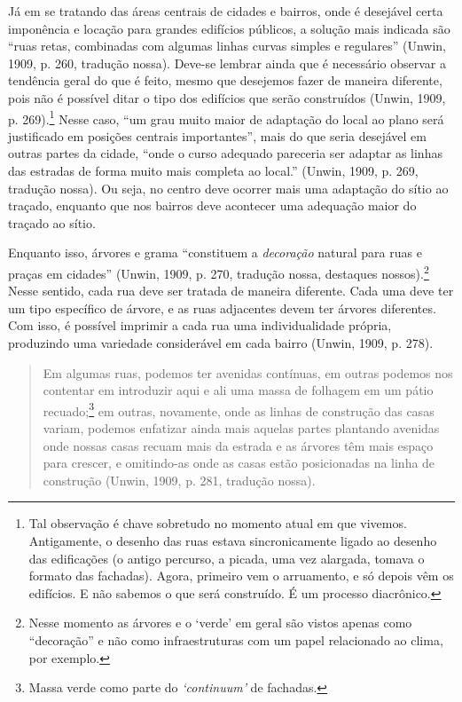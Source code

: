 \documentclass[12pt, a4paper]{book} %
\begin{document}
        Já em se tratando das áreas centrais de cidades e bairros, onde é desejável certa imponência e locação para grandes edifícios públicos, a solução mais indicada são ``ruas retas, combinadas com algumas linhas curvas simples e regulares'' (Unwin, 1909, p. 260, tradução nossa). Deve-se lembrar ainda que é necessário observar a tendência geral do que é feito, mesmo que desejemos fazer de maneira diferente, pois não é possível ditar o tipo dos edifícios que serão construídos (Unwin, 1909, p. 269).\footnote[13]{Tal observação é chave sobretudo no momento atual em que vivemos. Antigamente, o desenho das ruas estava sincronicamente ligado ao desenho das edificações (o antigo percurso, a picada, uma vez alargada, tomava o formato das fachadas). Agora, primeiro vem o arruamento, e só depois vêm os edifícios. E não sabemos o que será construído. É um processo diacrônico.} Nesse caso, ``um grau muito maior de adaptação do local ao plano será justificado em posições centrais importantes'', mais do que seria desejável em outras partes da cidade, ``onde o curso adequado pareceria ser adaptar as linhas das estradas de forma muito mais completa ao local.'' (Unwin, 1909, p. 269, tradução nossa). Ou seja, no centro deve ocorrer mais uma adaptação do sítio ao traçado, enquanto que nos bairros deve acontecer uma adequação maior do traçado ao sítio.

        Enquanto isso, árvores e grama ``constituem a \textit{decoração} natural para ruas e praças em cidades'' (Unwin, 1909, p. 270, tradução nossa, destaques nossos).\footnote[14]{Nesse momento as árvores e o `verde' em geral são vistos apenas como ``decoração'' e não como infraestruturas com um papel relacionado ao clima, por exemplo.} Nesse sentido, cada rua deve ser tratada de maneira diferente. Cada uma deve ter um tipo específico de árvore, e as ruas adjacentes devem ter árvores diferentes. Com isso, é possível imprimir a cada rua uma individualidade própria, produzindo uma variedade considerável em cada bairro (Unwin, 1909, p. 278).

        \begin{quotation}
            Em algumas ruas, podemos ter avenidas contínuas, em outras podemos nos contentar em introduzir aqui e ali uma massa de folhagem em um pátio recuado;\footnote[89]{Massa verde como parte do \textit{`continuum'} de fachadas.} em outras, novamente, onde as linhas de construção das casas variam, podemos enfatizar ainda mais aquelas partes plantando avenidas onde nossas casas recuam mais da estrada e as árvores têm mais espaço para crescer, e omitindo-as onde as casas estão posicionadas na linha de construção (Unwin, 1909, p. 281, tradução nossa).
        \end{quotation}
\end{document}
